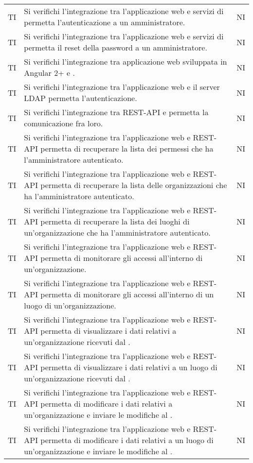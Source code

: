 {\begin{longtable}{ c C{8.5cm} C{1cm}}
TI & Si verifichi l’integrazione tra l’applicazione web e servizi di  permetta l’autenticazione a un amministratore. & NI \\
TI & Si verifichi l’integrazione tra l’applicazione web e servizi di  permetta il reset della password a un amministratore. & NI \\
TI & Si verifichi l’integrazione tra applicazione web sviluppata in Angular 2+ e .& NI \\
TI & Si verifichi l’integrazione tra l’applicazione web e il server LDAP permetta l’autenticazione.& NI \\
TI & Si verifichi l’integrazione tra REST-API e  permetta la comunicazione fra loro.& NI \\
TI & Si verifichi l’integrazione tra l’applicazione web e REST-API permetta di recuperare la lista dei permessi che ha l’amministratore autenticato.& NI \\
TI & Si verifichi l’integrazione tra l’applicazione web e REST-API permetta di recuperare la lista delle organizzazioni che ha l’amministratore autenticato.& NI \\
TI & Si verifichi l’integrazione tra l’applicazione web e REST-API permetta di recuperare la lista dei luoghi di un’organizzazione che ha l’amministratore autenticato.& NI \\
TI & Si verifichi l’integrazione tra l’applicazione web e REST-API permetta di monitorare gli accessi all’interno di un’organizzazione.& NI \\
TI & Si verifichi l’integrazione tra l’applicazione web e REST-API permetta di monitorare gli accessi all’interno di un luogo di un’organizzazione.& NI \\
TI & Si verifichi l’integrazione tra l’applicazione web e REST-API permetta di visualizzare i dati relativi a un’organizzazione ricevuti dal .& NI \\
TI & Si verifichi l’integrazione tra l’applicazione web e REST-API permetta di visualizzare i dati relativi a un luogo di un’organizzazione ricevuti dal .& NI \\
TI & Si verifichi l’integrazione tra l’applicazione web e REST-API permetta di modificare i dati relativi a un’organizzazione e inviare le modifiche al .& NI \\
TI & Si verifichi l’integrazione tra l’applicazione web e REST-API permetta di modificare i dati relativi a un luogo di un’organizzazione e inviare le modifiche al .& NI \\

\end{longtable}}
